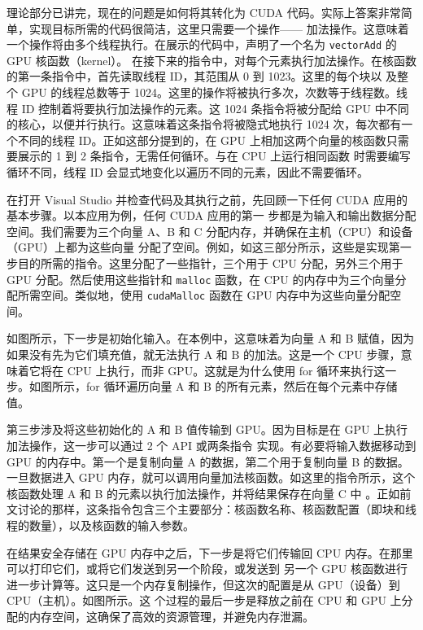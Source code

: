 理论部分已讲完，现在的问题是如何将其转化为 CUDA 代码。实际上答案非常简单，实现目标所需的代码很简洁，这里只需要一个操作——
加法操作。这意味着一个操作将由多个线程执行。在展示的代码中，声明了一个名为 \texttt{vectorAdd} 的 GPU 核函数（kernel）。
在接下来的指令中，对每个元素执行加法操作。在核函数的第一条指令中，首先读取线程 ID，其范围从 0 到 1023。这里的每个块以
及整个 GPU 的线程总数等于 1024。这里的操作将被执行多次，次数等于线程数。线程 ID 控制着将要执行加法操作的元素。这 
1024 条指令将被分配给 GPU 中不同的核心，以便并行执行。这意味着这条指令将被隐式地执行 1024 次，每次都有一个不同的线程 
ID。正如这部分提到的，在 GPU 上相加这两个向量的核函数只需要展示的 1 到 2 条指令，无需任何循环。与在 CPU 上运行相同函数
时需要编写循环不同，线程 ID 会显式地变化以遍历不同的元素，因此不需要循环。

在打开 Visual Studio 并检查代码及其执行之前，先回顾一下任何 CUDA 应用的基本步骤。以本应用为例，任何 CUDA 应用的第一
步都是为输入和输出数据分配空间。我们需要为三个向量 A、B 和 C 分配内存，并确保在主机（CPU）和设备（GPU）上都为这些向量
分配了空间。例如，如这三部分所示，这些是实现第一步目的所需的指令。这里分配了一些指针，三个用于 CPU 分配，另外三个用于 
GPU 分配。然后使用这些指针和 \texttt{malloc} 函数，在 CPU 的内存中为三个向量分配所需空间。类似地，使用 
\texttt{cudaMalloc} 函数在 GPU 内存中为这些向量分配空间。

如图所示，下一步是初始化输入。在本例中，这意味着为向量 A 和 B 赋值，因为如果没有先为它们填充值，就无法执行 A 和 B 
的加法。这是一个 CPU 步骤，意味着它将在 CPU 上执行，而非 GPU。这就是为什么使用 for 循环来执行这一步。如图所示，for 
循环遍历向量 A 和 B 的所有元素，然后在每个元素中存储值。



第三步涉及将这些初始化的 A 和 B 值传输到 GPU。因为目标是在 GPU 上执行加法操作，这一步可以通过 2 个 API 或两条指令
实现。有必要将输入数据移动到 GPU 的内存中。第一个是复制向量 A 的数据，第二个用于复制向量 B 的数据。一旦数据进入 GPU 
内存，就可以调用向量加法核函数。如这里的指令所示，这个核函数处理 A 和 B 的元素以执行加法操作，并将结果保存在向量 C 中
。正如前文讨论的那样，这条指令包含三个主要部分：核函数名称、核函数配置（即块和线程的数量），以及核函数的输入参数。

在结果安全存储在 GPU 内存中之后，下一步是将它们传输回 CPU 内存。在那里可以打印它们，或将它们发送到另一个阶段，或发送到
另一个 GPU 核函数进行进一步计算等。这只是一个内存复制操作，但这次的配置是从 GPU（设备）到 CPU（主机）。如图所示。这
个过程的最后一步是释放之前在 CPU 和 GPU 上分配的内存空间，这确保了高效的资源管理，并避免内存泄漏。

